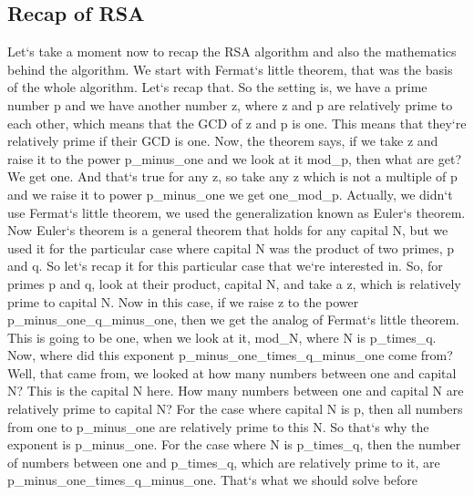\subsection{Recap of RSA}
Let`s take a moment now to recap the RSA algorithm and also the mathematics behind the algorithm.
We start with Fermat`s little theorem, that was the basis of the whole algorithm.
Let`s recap that.
So the setting is, we have a prime number p and we have another number z, where z and p are relatively prime to each other, which means that the GCD of z and p is one.
This means that they`re relatively prime if their GCD is one.
Now, the theorem says, if we take z and raise it to the power p\_minus\_one and we look at it mod\_p, then what are get? We get one.
And that`s true for any z, so take any z which is not a multiple of p and we raise it to power p\_minus\_one we get one\_mod\_p.
Actually, we didn`t use Fermat`s little theorem, we used the generalization known as Euler`s theorem.
Now Euler`s theorem is a general theorem that holds for any capital N, but we used it for the particular case where capital N was the product of two primes, p and q.
So let`s recap it for this particular case that we`re interested in.
So, for primes p and q, look at their product, capital N, and take a z, which is relatively prime to capital N\@.
Now in this case, if we raise z to the power p\_minus\_one\_q\_minus\_one, then we get the analog of Fermat`s little theorem.
This is going to be one, when we look at it, mod\_N, where N is p\_times\_q.
Now, where did this exponent p\_minus\_one\_times\_q\_minus\_one come from? Well, that came from, we looked at how many numbers between one and capital N? This is the capital N here.
How many numbers between one and capital N are relatively prime to capital N? For the case where capital N is p, then all numbers from one to p\_minus\_one are relatively prime to this N\@.
So that`s why the exponent is p\_minus\_one.
For the case where N is p\_times\_q, then the number of numbers between one and p\_times\_q, which are relatively prime to it, are p\_minus\_one\_times\_q\_minus\_one.
That`s what we should solve before

